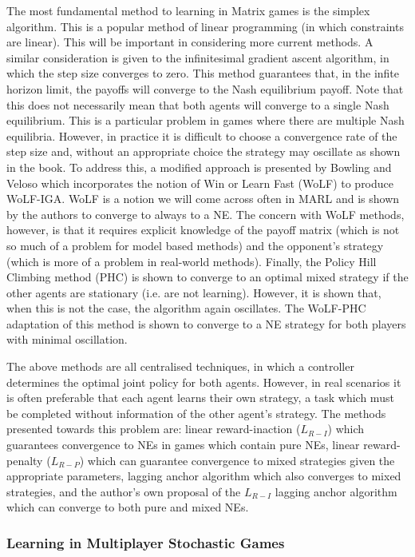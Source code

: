 \documentclass[preprint,11pt]{report}
\begin{document}
The most fundamental method to learning in Matrix games is the simplex algorithm. This is a popular
method of linear programming (in which constraints are linear). This will be important in
considering more current methods. A similar consideration is given to the infinitesimal gradient
ascent algorithm, in which the step size converges to zero. This method guarantees that, in the
infite horizon limit, the payoffs will converge to the Nash equilibrium payoff. Note that this does
not necessarily mean that both agents will converge to a single Nash equilibrium. This is a
particular problem in games where there are multiple Nash equilibria. However, in practice it is
difficult to choose a convergence rate of the step size and, without an appropriate choice the
strategy may oscillate as shown in the book. To address this, a modified approach is presented by
Bowling and Veloso which incorporates the notion of Win or Learn Fast (WoLF) to produce WoLF-IGA.
WoLF is a notion we will come across often in MARL and is shown by the authors to converge to always
to a NE. The concern with WoLF methods, however, is that it requires explicit knowledge of the
payoff matrix (which is not so much of a problem for model based methods) and the opponent's
strategy (which is more of a problem in real-world methods). Finally, the Policy Hill Climbing
method (PHC) is shown to converge to an optimal mixed strategy if the other agents are stationary
(i.e. are not learning). However, it is shown that, when this is not the case, the algorithm again
oscillates. The WoLF-PHC adaptation of this method is shown to converge to a NE strategy for both
players with minimal oscillation. 

The above methods are all centralised techniques, in which a controller determines the optimal joint
policy for both agents. However, in real scenarios it is often preferable that each agent learns
their own strategy, a task which must be completed without information of the other agent's
strategy. The methods presented towards this problem are: linear reward-inaction ($L_{R-I}$) which
guarantees convergence to NEs in games which contain pure NEs, linear reward-penalty ($L_{R-P}$)
which can guarantee convergence to mixed strategies given the appropriate parameters, lagging anchor
algorithm which also converges to mixed strategies, and the author's own proposal of the $L_{R-I}$
lagging anchor algorithm which can converge to both pure and mixed NEs.

\subsubsection*{Learning in Multiplayer Stochastic Games}
\end{document}
